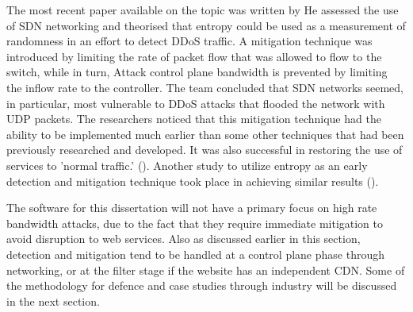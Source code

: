 The most recent paper available on the topic was written by \citeauthor{ahalawat2019entropy} He assessed the use of SDN networking and theorised that entropy could be used as a measurement of randomness in an effort to detect DDoS traffic. A mitigation technique was introduced by limiting the rate of packet flow that was allowed to flow to the switch, while in turn, Attack control plane bandwidth is prevented by limiting the inflow rate to the controller.  The team concluded that SDN networks seemed, in particular, most vulnerable to DDoS attacks that flooded the network with UDP packets. The researchers noticed that this mitigation technique had the ability to be implemented much earlier than some other techniques that had been previously researched and developed. It was also successful in restoring the use of services to 'normal traffic.' (\cite{ahalawat2019entropy}). Another study to utilize entropy as an early detection and mitigation technique took place in \citeyear{kumar2018safety} achieving similar results (\cite{kumar2018safety}).

The software for this dissertation will not have a primary focus on high rate bandwidth attacks, due to the fact that they require immediate mitigation to avoid disruption to web services. Also as discussed earlier in this section, detection and mitigation tend to be handled at a control plane phase through networking, or at the filter stage if the website has an independent CDN. Some of the methodology for defence and case studies through industry will be discussed in the next section.